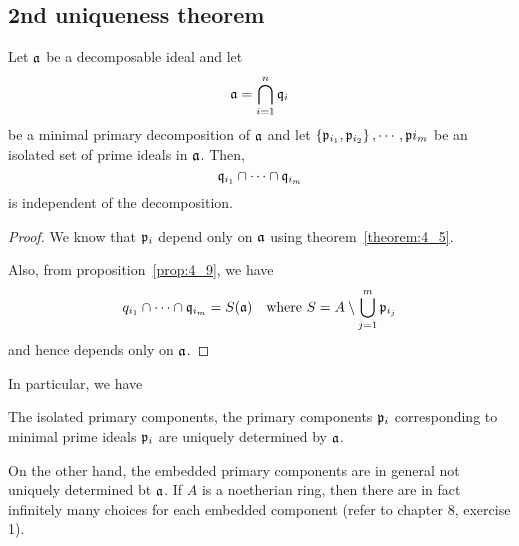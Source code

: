 \subsection{2nd uniqueness theorem}
\begin{theorem}{}{}
\label{theorem:4_10}
	Let \(\mathfrak{a}\) be a decomposable ideal and let
	\[
		\mathfrak{a} = \bigcap_{i = 1}^{n} \mathfrak{q}_i
	\]
	be a minimal primary decomposition of \(\mathfrak{a}\) and let
	\(\left\{ \mathfrak{p}_{i_1}, \mathfrak{p}_{i_2} \right\}, \cdots, \mathfrak{p}{i_m}\) be an
	isolated set of prime ideals in \(\mathfrak{a}\).
	Then,
	\[
		\mathfrak{q}_{i_1} \cap \cdots \cap \mathfrak{q}_{i_m}
	\]
	is independent of the decomposition.
\end{theorem}
\begin{proof}
	We know that \(\mathfrak{p}_i\) depend only on \(\mathfrak{a}\) using
	theorem~\ref{theorem:4_5}.

	Also, from proposition~\ref{prop:4_9}, we have
	\[
		q_{i_1} \cap \cdots \cap \mathfrak{q}_{i_m} =
		S(\mathfrak{a}) \quad \text{where } S = A \setminus
		\bigcup_{j = 1}^{m} \mathfrak{p}_{i_j}
	\]
	and hence depends only on \(\mathfrak{a}\).
\end{proof}

In particular, we have
\begin{corollary}{}{}
\label{corollary:4_11}
	The isolated primary components, the primary components \(\mathfrak{p}_i\)
	corresponding to minimal prime ideals \(\mathfrak{p}_i\) are uniquely determined
	by \(\mathfrak{a}\).
\end{corollary}

\begin{note}
	On the other hand, the embedded primary components are in general
	not uniquely determined bt \(\mathfrak{a}\).
	If \(A\) is a noetherian ring, then there are in fact
	infinitely many choices for each embedded component
	(refer to chapter 8, exercise 1).
\end{note}